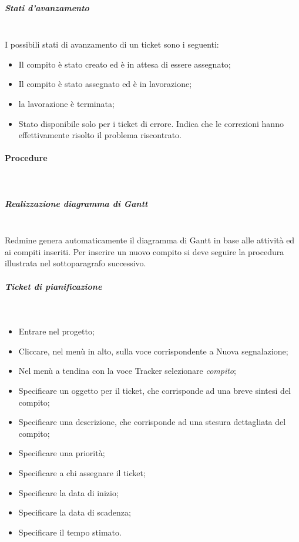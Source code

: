 \subparagraph{Stati d'avanzamento} \hfill \\


I possibili stati di avanzamento di un ticket sono i seguenti:
\begin{itemize}
\item {} Il compito è stato creato ed è in attesa di essere assegnato;
\item {}  Il compito è stato assegnato ed è in lavorazione;
\item {} la lavorazione è terminata;
\item {} Stato disponibile solo per i ticket di errore. Indica che le correzioni hanno effettivamente risolto il problema riscontrato.

\end{itemize}


\paragraph{Procedure} \hfill \\
\label{2}
\subparagraph{Realizzazione diagramma di Gantt} \hfill \\
\label{1}
Redmine genera automaticamente il diagramma di Gantt in base alle attivit\`{a} ed ai compiti inseriti.
Per inserire un nuovo compito si deve seguire la procedura illustrata nel sottoparagrafo successivo.

\subparagraph{Ticket di pianificazione} \hfill \\
\begin{itemize}
\item Entrare nel progetto;
\item Cliccare, nel menù in alto, sulla voce corrispondente a Nuova segnalazione;
\item Nel menù a tendina con la voce Tracker selezionare \textit{compito};
\item Specificare un oggetto per il ticket, che corrisponde ad una breve sintesi del compito;
\item Specificare una descrizione, che corrisponde ad una stesura dettagliata del compito;
\item Specificare una priorità;
\item Specificare a chi assegnare il ticket;
\item Specificare la data di inizio;
\item Specificare la data di scadenza;
\item Specificare il tempo stimato.
\end{itemize}

